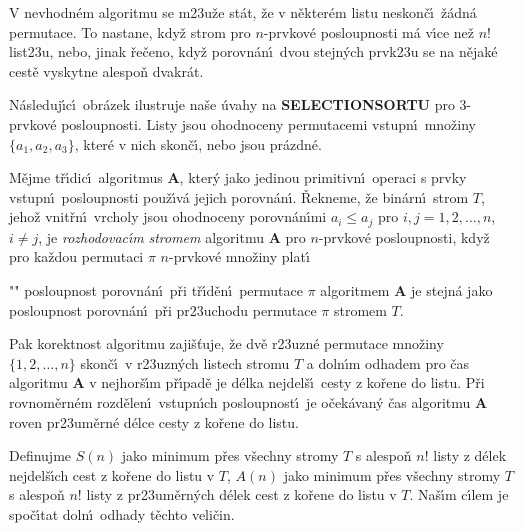 \flushpar V nevhodn\'em algoritmu se m\accent23u\v ze st\'at, \v ze 
v n\v ekter\'em listu neskon\v c\'\i\ \v z\'adn\'a permutace. To  
nastane, kdy\v z strom pro $n$-prvkov\'e posloupnosti m\'a v\'\i ce 
ne\v z $n!$ list\accent23u, nebo, jinak \v re\v ceno, kdy\v z 
porovn\'an\'\i\ dvou stejn\'ych prvk\accent23u se na n\v ejak\'e cest\v e 
vyskytne alespo\v n dvakr\'at. 
\medskip

\flushpar N\'asleduj\'\i c\'\i\ obr\'azek ilustruje na\v se \'uvahy na 
{\bf SELECTIONSORTU} pro $3$-prvkov\'e posloupnosti. Listy jsou 
ohodnoceny permutacemi vstupn\'\i\ mno\v ziny 
$\{a_1,a_2,a_3\}$, kter\'e v nich 
skon\v c\'\i , nebo jsou pr\'azdn\'e. 
\midinsert
\centerline{}
\endcaption
\endinsert
\medskip

M\v ejme t\v r\'\i dic\'\i\ algoritmus {\bf A}, kter\'y 
jako jedinou pri\-mitivn\'\i\ operaci s prvky vstupn\'\i\ 
posloupnosti pou\v z\'\i v\'a jejich porov\-n\'an\'\i . \v Rekneme, \v ze bin\'arn\'\i\ 
strom $T$, jeho\v z vnit\v rn\'\i\ vrcholy jsou ohodnoceny 
porovn\'an\'\i mi  $a_i\le a_j$ pro $i,j=1,2,\dots,n$, $i\ne j$, je 
\emph{rozhodovac\'\i m} \emph{stromem} algoritmu {\bf A} pro 
$n$-prvkov\'e posloupnosti, kdy\v z pro ka\v zdou permutaci $\pi$
$n$-prvkov\'e mno\v ziny plat\'\i\ 
\roster
\item"{}"
posloupnost porovn\'an\'\i\ p\v ri t\v r\'\i d\v en\'\i\ permutace $
\pi$ 
algoritmem {\bf A} je stejn\'a jako po\-sloupnost porovn\'an\'\i\ p\v ri 
pr\accent23uchodu permutace $\pi$ stromem $T$.
\endroster
\enddefinition
\medskip

\flushpar Pak korektnost algoritmu zaji\v s\v tuje, \v ze dv\v e r\accent23uzn\'e 
permutace mno\v ziny $\{1,2,\dots,n\}$ skon\v c\'\i\ v 
r\accent23uzn\'ych listech stromu $T$ a dol\-n\'\i m odhadem pro 
\v cas algoritmu {\bf A} v nej\-hor\v s\'\i m p\v r\'\i pad\v e je d\'elka nejdel\v s\'\i\ 
cesty z ko\v rene do listu.  
P\v ri rovnom\v ern\'em 
rozd\v elen\'\i\ vstupn\'\i ch po\-sloupnost\'\i\ je o\v cek\'avan\'y \v cas 
algoritmu {\bf A} roven pr\accent23um\v ern\'e d\'elce cesty z ko\v rene do 
listu.  
\medskip

\flushpar Definujme\newline 
$S(n)$ jako minimum p\v res v\v sechny stromy $T$ s alespo\v n $n
!$ listy z 
d\'elek nejdel\v s\'\i ch cest z ko\v rene 
do listu v $T$, \newline 
$A(n)$ jako minimum p\v res v\v sechny stromy $T$ s alespo\v n $n
!$ listy z
pr\accent23um\v ern\'ych d\'elek cest z ko\v rene do listu v $T$.\newline 
Na\v s\'\i m c\'\i lem je spo\v c\'\i tat doln\'\i\ odhady t\v echto veli\v cin.
\medskip

